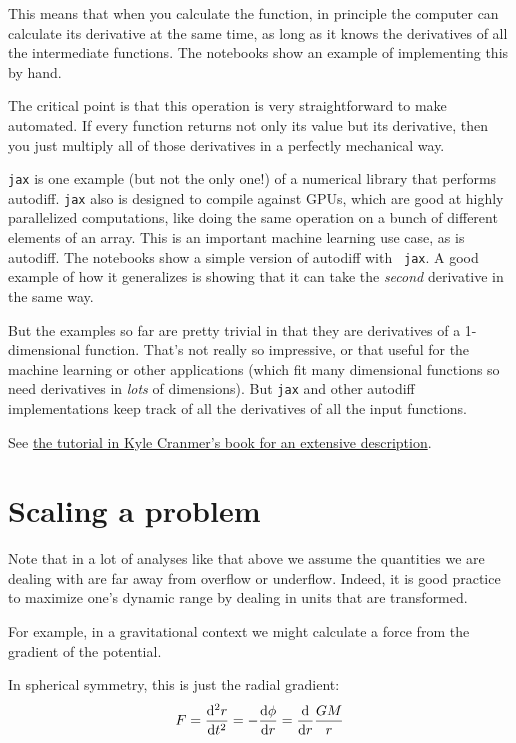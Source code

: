 This means that when you calculate the function, in principle the
computer can calculate its derivative at the same time, as long as it
knows the derivatives of all the intermediate functions. The notebooks
show an example of implementing this by hand.

The critical point is that this operation is very straightforward to
make automated. If every function returns not only its value but its
derivative, then you just multiply all of those derivatives in a
perfectly mechanical way. 

{\tt jax} is one example (but not the only one!) of a numerical
library that performs autodiff. {\tt jax} also is designed to compile
against GPUs, which are good at highly parallelized computations, like
doing the same operation on a bunch of different elements of an
array. This is an important machine learning use case, as is
autodiff. The notebooks show a simple version of autodiff with {\tt
jax}. A good example of how it generalizes is showing that it can take
the {\it second} derivative in the same way. 

But the examples so far are pretty trivial in that they are
derivatives of a 1-dimensional function. That's not really so
impressive, or that useful for the machine learning or other
applications (which fit many dimensional functions so need derivatives
in {\it lots} of dimensions). But {\tt jax} and other autodiff
implementations keep track of all the derivatives of all the input
functions. 

See \href{http://theoryandpractice.org/stats-ds-book/autodiff-tutorial.html}{the
tutorial in Kyle Cranmer's book for an extensive description}.

\section{Scaling a problem}

Note that in a lot of analyses like that above we assume the
quantities we are dealing with are far away from overflow or
underflow. Indeed, it is good practice to maximize one's dynamic range
by dealing in units that are transformed. 

For example, in a gravitational context we might calculate a force
from the gradient of the potential.


\begin{answer}
In spherical symmetry, this is
just the radial gradient:
\begin{equation}
F = \frac{{\rm d}^2r}{{\rm d}t^2} = - \frac{{\rm d}\phi}{{\rm d}r} =
\frac{{\rm d}}{{\rm d}r} \frac{GM}{r}
\end{equation}
\end{answer}

